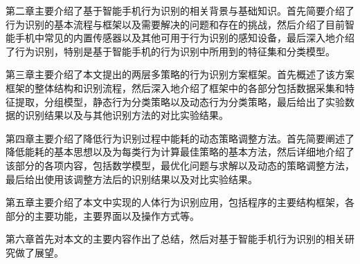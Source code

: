 \par 第二章主要介绍了基于智能手机行为识别的相关背景与基础知识。首先简要介绍了行为识别的基本流程与框架以及需要解决的问题和存在的挑战，然后介绍了目前智能手机中常见的内置传感器以及其他可用于行为识别的感知设备，最后深入地介绍了行为识别，特别是基于智能手机的行为识别中所用到的特征集和分类模型。

\par 第三章主要介绍了本文提出的两层多策略的行为识别方案框架。首先概述了该方案框架的整体结构和识别流程，然后深入地介绍了框架中的各部分包括数据采集和特征提取，分组模型，静态行为分类策略以及动态行为分类策略，最后给出了实验数据的识别结果以及与其他识别方法的对比实验结果。

\par 第四章主要介绍了降低行为识别过程中能耗的动态策略调整方法。首先简要阐述了降低能耗的基本思想以及为每类行为计算最佳策略的基本方法，然后详细地介绍了该部分的各项内容，包括数学模型，最优化问题与求解以及动态的策略调整方法，最后给出使用该调整方法后的识别结果以及对比实验结果。

\par 第五章主要介绍了本文中实现的人体行为识别应用，包括程序的主要结构框架，各部分的主要功能，主要界面以及操作方式等。

\par 第六章首先对本文的主要内容作出了总结，然后对基于智能手机行为识别的相关研究做了展望。
